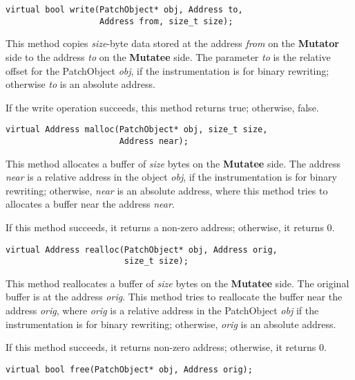 \begin{verbatim}
virtual bool write(PatchObject* obj, Address to,
                   Address from, size_t size);

\end{verbatim}



This method copies \emph{size}-byte data stored at the address \emph{from} on the
\textbf{Mutator} side to the address \emph{to} on the \textbf{Mutatee} side. The parameter \emph{to} is
the relative offset for the PatchObject \emph{obj}, if the instrumentation is for
binary rewriting; otherwise \emph{to} is an absolute address.

If the write operation succeeds, this method returns true; otherwise, false.


\begin{verbatim}
virtual Address malloc(PatchObject* obj, size_t size,
                       Address near);

\end{verbatim}



This method allocates a buffer of \emph{size} bytes on the \textbf{Mutatee} side. The
address \emph{near} is a relative address in the object \emph{obj}, if the instrumentation
is for binary rewriting; otherwise, \emph{near} is an absolute address, where this
method tries to allocates a buffer near the address \emph{near}.

If this method succeeds, it returns a non-zero address; otherwise, it returns 0.


\begin{verbatim}
virtual Address realloc(PatchObject* obj, Address orig,
                        size_t size);

\end{verbatim}



This method reallocates a buffer of \emph{size} bytes on the \textbf{Mutatee} side. The
original buffer is at the address \emph{orig}. This method tries to reallocate the
buffer near the address \emph{orig}, where \emph{orig} is a relative address in the
PatchObject \emph{obj} if the instrumentation is for binary rewriting; otherwise,
\emph{orig} is an absolute address.

If this method succeeds, it returns non-zero address; otherwise, it returns 0.


\begin{verbatim}
virtual bool free(PatchObject* obj, Address orig);

\end{verbatim}



